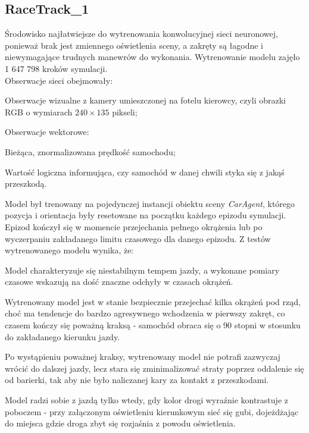 \subsection{RaceTrack\_1}
Środowisko najłatwiejsze do wytrenowania konwolucyjnej sieci neuronowej, ponieważ brak jest zmiennego oświetlenia sceny, a zakręty są łagodne i niewymagające trudnych manewrów do wykonania. Wytrenowanie modelu zajęło 1 647 798 kroków symulacji. \\
Obserwacje sieci obejmowały:
\vspace*{-0.5cm}
\begin{enumerate*}
\item Obserwacje wizualne z kamery umieszczonej na fotelu kierowcy, czyli obrazki RGB o wymiarach $240 \times 135$ pikseli;
\item Obserwacje wektorowe:
\begin{itemize*}
\item Bieżąca, znormalizowana prędkość samochodu;
\item Wartość logiczna informująca, czy samochód w danej chwili styka się z jakąś przeszkodą.
\end{itemize*}
\end{enumerate*}

Model był trenowany na pojedynczej instancji obiektu sceny \textit{CarAgent}, którego pozycja i orientacja były resetowane na początku każdego epizodu symulacji. Epizod kończył się w momencie przejechania pełnego okrążenia lub po wyczerpaniu zakładanego limitu czasowego dla danego epizodu. Z testów wytrenowanego modelu wynika, że:
\vspace*{-0.5cm}
\begin{enumerate*}
\item Model charakteryzuje się niestabilnym tempem jazdy, a wykonane pomiary czasowe wskazują na dość znaczne odchyły w czasach okrążeń.
\item Wytrenowany model jest w stanie bezpiecznie przejechać kilka okrążeń pod rząd, choć ma tendencje do bardzo agresywnego wchodzenia w pierwszy zakręt, co czasem kończy się poważną kraksą - samochód obraca się o 90 stopni w stosunku do zakładanego kierunku jazdy.
\item Po wystąpieniu poważnej kraksy, wytrenowany model nie potrafi zazwyczaj wrócić do dalszej jazdy, lecz stara się zminimalizować straty poprzez oddalenie się od barierki, tak aby nie było naliczanej kary za kontakt z przeszkodami.
\item Model radzi sobie z jazdą tylko wtedy, gdy kolor drogi wyraźnie kontrastuje z poboczem - przy załączonym oświetleniu kierunkowym sieć się gubi, dojeżdżając do miejsca gdzie droga zbyt się rozjaśnia z powodu oświetlenia.
\end{enumerate*}

